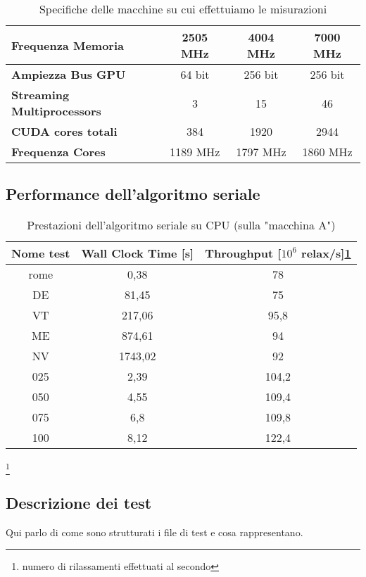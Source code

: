 \documentclass[a4paper]{article}
\begin{document}
\begin{table}[!ht]
\begin{tabular}{|l|c|c|c|}
			\textbf{Frequenza Memoria} & 2505 MHz & 4004 MHz & 7000 MHz \\ \hline
			\textbf{Ampiezza Bus GPU} & 64 bit & 256 bit & 256 bit \\ \hline
			\textbf{Streaming Multiprocessors} & 3 & 15 & 46 \\ \hline
			\textbf{CUDA cores totali} & 384 & 1920 & 2944 \\ \hline
			\textbf{Frequenza Cores} & 1189 MHz & 1797 MHz & 1860 MHz \\ \hline
		\end{tabular}
		\label{tab:specs}
		\caption{Specifiche delle macchine su cui effettuiamo le misurazioni}
	\end{table}

	\subsection{Performance dell'algoritmo seriale}
	\begin{table}[!ht]
		\centering
		\begin{tabular}{|c|c|c|}
			\hline
			\textbf{Nome test} & \textbf{Wall Clock Time [s]} & \textbf{Throughput [$10^6$ relax/s]\ref{foot:relax}} \\ \hline
			       rome & 0,38 & 78 \\ \hline
			        DE & 81,45 & 75 \\ \hline
			        VT & 217,06 & 95,8 \\ \hline
			        ME & 874,61 & 94 \\ \hline
			        NV & 1743,02 & 92 \\ \hline
			        025 & 2,39 & 104,2 \\ \hline
			        050 & 4,55 & 109,4 \\ \hline
			        075 & 6,8 & 109,8 \\ \hline
			        100 & 8,12 & 122,4 \\ \hline
		\end{tabular}
		\label{tab:performance_serial}
		\caption{Prestazioni dell'algoritmo seriale su CPU (sulla "macchina A")}
	\end{table}
	\footnote{\label{foot:relax} numero di rilassamenti effettuati al secondo}

	\subsection{Descrizione dei test}
	Qui parlo di come sono strutturati i file di test e cosa rappresentano.
	
\end{document}
